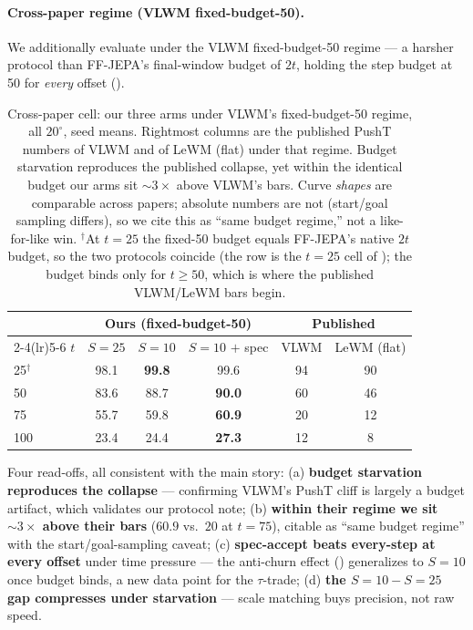 \documentclass[11pt]{article}
\newcommand{\ours}[1]{\textbf{#1}}          %
\newcommand{\degc}[1]{$#1^\circ$}
\begin{document}
\paragraph{Cross-paper regime (VLWM fixed-budget-50).} We additionally evaluate under the
VLWM \citep{vlwm} fixed-budget-50 regime --- a harsher protocol than FF-JEPA's
final-window budget of $2t$, holding the step budget at 50 for \emph{every} offset
().

\begin{table}[h]
\centering
\caption{Cross-paper cell: our three arms under VLWM's fixed-budget-50 regime, all
\degc{20}, seed means. Rightmost columns are the published PushT numbers of VLWM and of
LeWM (flat) under that regime. Budget starvation reproduces the published collapse, yet
within the identical budget our arms sit ${\sim}3\times$ above VLWM's bars. Curve
\emph{shapes} are comparable across papers; absolute numbers are not (start/goal sampling
differs), so we cite this as ``same budget regime,'' not a like-for-like win.
$^{\dagger}$At $t{=}25$ the fixed-50 budget equals FF-JEPA's native $2t$ budget, so the two
protocols coincide (the row is the $t{=}25$ cell of ); the budget binds
only for $t\geq50$, which is where the published VLWM/LeWM bars begin.}
\label{tab:vlwm}
\begin{tabular}{lccc cc}
\toprule
& \multicolumn{3}{c}{Ours (fixed-budget-50)} & \multicolumn{2}{c}{Published} \\
\cmidrule(lr){2-4}\cmidrule(lr){5-6}
$t$ & $S{=}25$ & $S{=}10$ & $S{=}10$ $+$ spec & VLWM & LeWM (flat) \\
\midrule
25$^{\dagger}$ & 98.1 & \ours{99.8} & 99.6 & 94 & 90 \\
50  & 83.6 & 88.7 & \ours{90.0} & 60 & 46 \\
75  & 55.7 & 59.8 & \ours{60.9} & 20 & 12 \\
100 & 23.4 & 24.4 & \ours{27.3} & 12 & 8  \\
\bottomrule
\end{tabular}
\end{table}

Four read-offs, all consistent with the main story: (a) \textbf{budget starvation
reproduces the collapse} --- confirming VLWM's PushT cliff is largely a budget artifact,
which validates our protocol note; (b) \textbf{within their regime we sit ${\sim}3\times$
above their bars} ($60.9$ vs.\ $20$ at $t{=}75$), citable as ``same budget regime'' with
the start/goal-sampling caveat; (c) \textbf{spec-accept beats every-step at every offset}
under time pressure --- the anti-churn effect () generalizes to $S{=}10$
once budget binds, a new data point for the $\tau$-trade; (d) \textbf{the $S{=}10{-}S{=}25$
gap compresses under starvation} --- scale matching buys precision, not raw speed.
\end{document}

